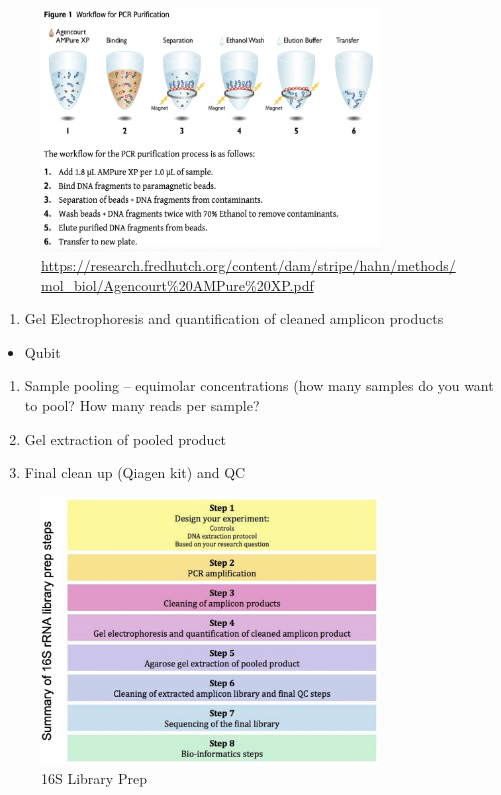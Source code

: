 \documentclass[
]{book}
\providecommand{\tightlist}{%
  \setlength{\itemsep}{0pt}\setlength{\parskip}{0pt}}
\begin{document}
\begin{figure}
\centering
\includegraphics[width=0.8\textwidth,height=\textheight]{./Figures/Ampure.png}
\caption{\url{https://research.fredhutch.org/content/dam/stripe/hahn/methods/mol_biol/Agencourt\%20AMPure\%20XP.pdf}}
\end{figure}

\begin{enumerate}
\def\labelenumi{\arabic{enumi}.}
\tightlist
\item
  Gel Electrophoresis and quantification of cleaned amplicon products
\end{enumerate}

\begin{itemize}
\tightlist
\item
  Qubit
\end{itemize}

\begin{enumerate}
\def\labelenumi{\arabic{enumi}.}
\setcounter{enumi}{1}
\tightlist
\item
  Sample pooling -- equimolar concentrations (how many samples do you want to pool? How many reads per sample?
\item
  Gel extraction of pooled product
\item
  Final clean up (Qiagen kit) and QC
\end{enumerate}

\begin{figure}
\centering
\includegraphics[width=0.8\textwidth,height=\textheight]{./Figures/LibSum.png}
\caption{16S Library Prep}
\end{figure}
\end{document}
